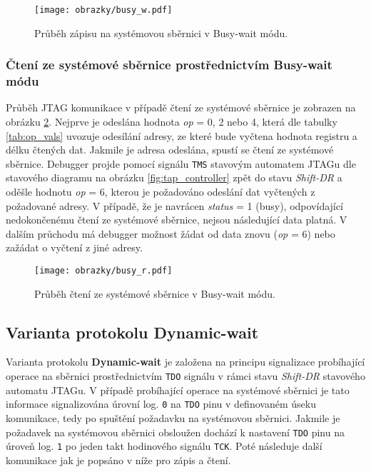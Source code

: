 \begin{figure}[H]
  \begin{center}
    \texttt{[image: obrazky/busy\_w.pdf]}
  \end{center}
  \caption{Průběh zápisu na systémovou sběrnici v Busy-wait módu.}
	\label{fig:busy_w}
\end{figure}

\subsubsection{Čtení ze systémové sběrnice prostřednictvím Busy-wait módu} 
Průběh JTAG komunikace v případě čtení ze systémové sběrnice je zobrazen na obrázku \ref{fig:busy_r}. Nejprve je odeslána hodnota \textit{op} = 0, 2 nebo 4, která dle tabulky \ref{tab:op_vals} uvozuje odesílání adresy, ze které bude vyčtena hodnota registru a délku čtených dat. Jakmile je adresa odeslána, spustí se čtení ze systémové sběrnice. Debugger projde pomocí signálu \texttt{\acs{TMS}} stavovým automatem JTAGu dle stavového diagramu na obrázku \ref{fig:tap_controller} zpět do stavu \textit{Shift-DR} a oděšle hodnotu \textit{op} = 6, kterou je požadováno odeslání dat vyčtených z požadované adresy. V případě, že je navrácen \textit{status} = 1 (busy), odpovídající nedokončenému čtení ze systémové sběrnice, nejsou následující data platná. V dalším průchodu má debugger možnost žádat od data znovu (\textit{op} = 6) nebo zažádat o vyčtení z jiné adresy.

\begin{figure}[!h]
  \begin{center}
    \texttt{[image: obrazky/busy\_r.pdf]}
  \end{center}
  \caption{Průběh čtení ze systémové sběrnice v Busy-wait módu.}
	\label{fig:busy_r}
\end{figure}

\subsection{Varianta protokolu Dynamic-wait}	\label{subsec:dyn-wait}
Varianta protokolu \textbf{Dynamic-wait} je založena na principu signalizace probíhající operace na sběrnici prostřednictvím \texttt{\acs{TDO}} signálu v rámci stavu \textit{Shift-DR} stavového automatu JTAGu. V případě probíhající operace na systémové sběrnici je tato informace signalizována úrovní log. \texttt{0} na \texttt{\acs{TDO}} pinu v definovaném úseku komunikace, tedy po spuštění požadavku na systémovou sběrnici. Jakmile je požadavek na systémovou sběrnici obsloužen dochází k nastavení \texttt{\acs{TDO}} pinu na úroveň log. \texttt{1} po jeden takt hodinového signálu \texttt{\acs{TCK}}. Poté následuje další komunikace jak je popsáno v níže pro zápis a čtení.

